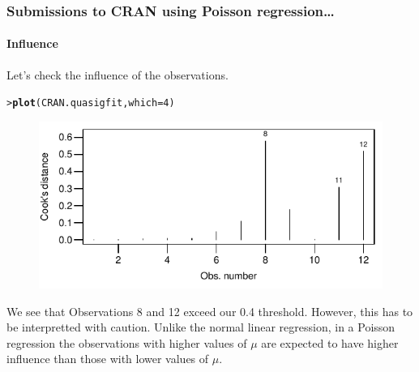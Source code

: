 \documentclass{beamer}\usepackage[]{graphicx}\usepackage[]{xcolor}
\makeatletter
\newcommand{\hlnum}[1]{\textcolor[rgb]{0.686,0.059,0.569}{#1}}%
\newcommand{\hlstd}[1]{\textcolor[rgb]{0.345,0.345,0.345}{#1}}%
\newcommand{\hlkwc}[1]{\textcolor[rgb]{0.333,0.667,0.333}{#1}}%
\newcommand{\hlkwd}[1]{\textcolor[rgb]{0.737,0.353,0.396}{\textbf{#1}}}%
\newenvironment{kframe}{%
 \def\at@end@of@kframe{}%
 \ifinner\ifhmode%
  \def\at@end@of@kframe{\end{minipage}}%
  \begin{minipage}{\columnwidth}%
 \fi\fi%
 \def\FrameCommand##1{\hskip\@totalleftmargin \hskip-\fboxsep
 \colorbox{shadecolor}{##1}\hskip-\fboxsep
     \hskip-\linewidth \hskip-\@totalleftmargin \hskip\columnwidth}%
 \MakeFramed {\advance\hsize-\width
   \@totalleftmargin\z@ \linewidth\hsize
   \@setminipage}}%
 {\par\unskip\endMakeFramed%
 \at@end@of@kframe}
\newenvironment{knitrout}{}{} %
\makeatother
\begin{document}
\begin{frame}[fragile]
\frametitle{Submissions to CRAN using Poisson regression\ldots}
\framesubtitle{Influence}
Let's check the influence of the observations. 

\begin{knitrout}\scriptsize
{}\color{fgcolor}\begin{kframe}
\begin{alltt}
\hlstd{> }\hlkwd{plot}\hlstd{(CRAN.quasigfit,} \hlkwc{which} \hlstd{=} \hlnum{4}\hlstd{)}
\end{alltt}
\end{kframe}
\end{knitrout}



\begin{figure}
  \centering
  \includegraphics[scale = 0.8]{figure/RC-H13-022c}
\end{figure}

We see that Observations 8 and 12 exceed our 0.4 threshold. However, this has to be interpretted with caution. Unlike the normal linear regression, in a Poisson regression the observations with higher values of $\mu$ are expected to have higher influence than those with lower values of $\mu$.
\end{frame}



\end{document}
